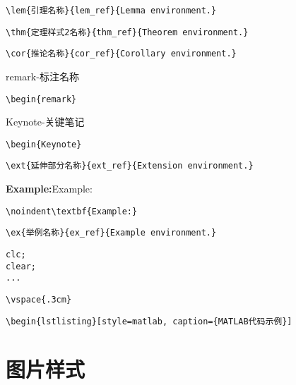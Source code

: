 \verb|\lem{引理名称}{lem_ref}{Lemma environment.}|

\verb|\thm{定理样式2名称}{thm_ref}{Theorem environment.}|

\verb|\cor{推论名称}{cor_ref}{Corollary environment.}|

\begin{remark}
    remark-标注名称
\end{remark}\verb|\begin{remark}|

\begin{Keynote}
    Keynote-关键笔记
\end{Keynote}\verb|\begin{Keynote}|

\verb|\ext{延伸部分名称}{ext_ref}{Extension environment.}|

\noindent\textbf{Example:}Example:

\verb|\noindent\textbf{Example:}|

\verb|\ex{举例名称}{ex_ref}{Example environment.}|

\vspace{.3cm}
\begin{lstlisting}[style=matlab, caption={MATLAB代码示例}]
% MATLAB代码示例
clc;
clear;
...
\end{lstlisting}

\verb|\vspace{.3cm}|

\verb|\begin{lstlisting}[style=matlab, caption={MATLAB代码示例}]|

\section{图片样式}
\begin{figure}[!htbp]
	\centering
\end{figure}

